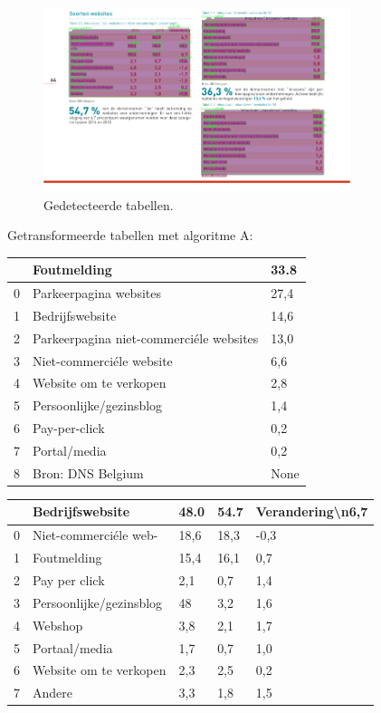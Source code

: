 \begin{figure}[H]
    \centering
    \includegraphics[width=0.8\textwidth]{test-resultaten/28/detected_tables.png}
    \caption{Gedetecteerde tabellen.}
\end{figure}

Getransformeerde tabellen met algoritme A:

\begin{tabular}{lll}
\toprule
{} &                              Foutmelding &  33.8 \\
\midrule
0 &                   Parkeerpagina websites &  27,4 \\
1 &                          Bedrijfswebsite &  14,6 \\
2 &  Parkeerpagina niet-commerciéle websites &  13,0 \\
3 &                 Niet-commerciéle website &   6,6 \\
4 &                   Website om te verkopen &   2,8 \\
5 &                  Persoonlijke/gezinsblog &   1,4 \\
6 &                            Pay-per-click &   0,2 \\
7 &                             Portal/media &   0,2 \\
8 &                        Bron: DNS Belgium &  None \\
\bottomrule
\end{tabular}

\begin{tabular}{lllll}
\toprule
{} &          Bedrijfswebsite &  48.0 &  54.7 & Verandering\textbackslash n6,7 \\
\midrule
0 &    Niet-commerciéle web- &  18,6 &  18,3 &             -0,3 \\
1 &              Foutmelding &  15,4 &  16,1 &              0,7 \\
2 &            Pay per click &   2,1 &   0,7 &              1,4 \\
3 &  Persoonlijke/gezinsblog &    48 &   3,2 &              1,6 \\
4 &                  Webshop &   3,8 &   2,1 &              1,7 \\
5 &            Portaal/media &   1,7 &   0,7 &              1,0 \\
6 &   Website om te verkopen &   2,3 &   2,5 &              0,2 \\
7 &                   Andere &   3,3 &   1,8 &              1,5 \\
\bottomrule
\end{tabular}

